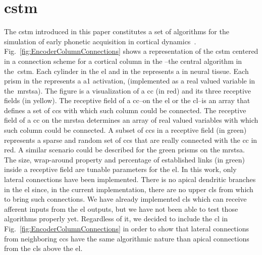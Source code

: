\documentclass[10pt,journal,compsoc]{IEEEtran}
\begin{document}




\section{\gls{cstm}}

The \gls{cstm} introduced in this paper constitutes a set of algorithms for the simulation of early phonetic acquisition in cortical dynamics~\cite{Dematties2018}. Fig.~\ref{fig:EncoderColumnConnections} shows a representation of the \gls{cstm} centered in a connection scheme for a cortical column in the --the central algorithm in the~\gls{cstm}. Each cylinder in the \gls{el} and in the  represents a  in neural tissue. Each prism in the  represents a \gls{a1} activation, (implemented as a real valued variable in the~\gls{mrstsa}). The figure is a visualization of a \gls{cc} (in red) and its three receptive fields (in yellow). The receptive field of a \gls{cc}--on the \gls{el} or the \gls{cl}--is an array that defines a set of \glspl{cc} with which such column could be connected. The receptive field of a \gls{cc} on the \gls{mrstsa} determines an array of real valued variables with which such column could be connected. A subset of \glspl{cc} in a receptive field (in green) represents a sparse and random set of \glspl{cc} that are really connected with the \gls{cc} in red. A similar scenario could be described for the green prisms on the \gls{mrstsa}. The size, wrap-around property and percentage of established links (in green) inside a receptive field are tunable parameters for the \gls{el}. In this work, only lateral connections have been implemented. There is no apical dendritic branches in the \gls{el} since, in the current implementation, there are no upper \glspl{cl} from which to bring such connections. We have already implemented \glspl{cl} which can receive afferent inputs from the \gls{el} outputs, but we have not been able to test those algorithms properly yet. Regardless of it, we decided to include the \gls{cl} in Fig.~\ref{fig:EncoderColumnConnections} in order to show that lateral connections from neighboring \glspl{cc} have the same algorithmic nature than apical connections from the \glspl{cl} above the \gls{el}.
\end{document}
